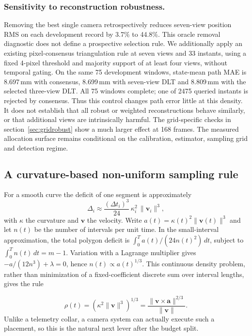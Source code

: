 \documentclass{iopjournal}
\begin{document}
\subsubsection{Sensitivity to reconstruction robustness.}
Removing the best single camera retrospectively reduces seven-view position
RMS on each development record by 3.7\% to 44.8\%. This oracle removal
diagnostic does not define a prospective selection rule. We additionally
apply an existing pixel-consensus triangulation rule at seven views and
33 instants, using a fixed 4-pixel threshold and majority support of at least
four views, without temporal gating. On the same 75 development windows,
state-mean path MAE is 8.697\,mm with consensus, 8.699\,mm with seven-view
DLT and 8.809\,mm with the selected three-view DLT. All 75 windows complete;
one of 2475 queried instants is rejected by consensus. Thus this control
changes path error little at this density. It does not establish that all
robust or weighted reconstructions behave similarly, or that additional
views are intrinsically harmful. The grid-specific checks in section~\ref{sec:gridrobust} show a much
larger effect at 168 frames. The measured allocation surface remains
conditional on the calibration, estimator, sampling grid and detection regime.

\subsection{A curvature-based non-uniform sampling rule}
\label{sec:nonuniform}
For a smooth curve the deficit of one segment is approximately
\begin{equation}
\Delta_{i} \approx \frac{(\Delta t_{i})^{3}}{24}\,
\kappa_{i}^{2}\,\lVert \mathbf{v}_{i} \rVert^{3},
\label{eq:deficit}
\end{equation}
with $\kappa$ the curvature and $\mathbf{v}$ the velocity. Write
$a(t)=\kappa(t)^2\lVert\mathbf{v}(t)\rVert^3$ and let $n(t)$ be the number
of intervals per unit time. In the small-interval approximation, the total
polygon deficit is $\int_0^T a(t)/(24n(t)^2)\,dt$, subject to
$\int_0^T n(t)\,dt=m-1$. Variation with a Lagrange multiplier gives
$-a/(12n^3)+\lambda=0$, hence $n(t)\propto a(t)^{1/3}$. This continuous
density problem, rather than minimization of a fixed-coefficient discrete
sum over interval lengths, gives the rule

\begin{equation}
\rho(t) = \left(\kappa^{2}\lVert\mathbf{v}\rVert^{3}\right)^{1/3}
= \frac{\lVert \mathbf{v}\times\mathbf{a}\rVert^{2/3}}
{\lVert \mathbf{v}\rVert}.
\label{eq:rho}
\end{equation}
Unlike a telemetry collar, a camera system can actually execute such a
placement, so this is the natural next lever after the budget split.
\end{document}
